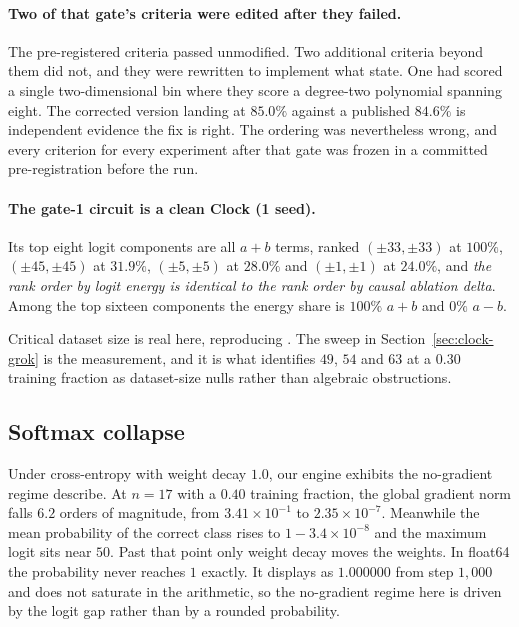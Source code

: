 \paragraph{Two of that gate's criteria were edited after they failed.} The pre-registered
criteria passed unmodified. Two additional criteria beyond them did not, and they were
rewritten to implement what \citet{nanda2023progress} state. One had scored a single
two-dimensional bin where they score a degree-two polynomial spanning eight. The corrected
version landing at $85.0\%$ against a published $84.6\%$ is independent evidence the fix is
right. The ordering was nevertheless wrong, and every criterion for every experiment after
that gate was frozen in a committed pre-registration before the run.

\paragraph{The gate-1 circuit is a clean Clock \textup{(1 seed)}.} Its top eight logit
components are all $a+b$ terms, ranked $(\pm 33, \pm 33)$ at $100\%$, $(\pm 45, \pm 45)$ at
$31.9\%$, $(\pm 5, \pm 5)$ at $28.0\%$ and $(\pm 1, \pm 1)$ at $24.0\%$, and \emph{the rank
order by logit energy is identical to the rank order by causal ablation delta}. Among the top
sixteen components the energy share is $100\%$ $a+b$ and $0\%$ $a-b$.

Critical dataset size is real here, reproducing \citet{power2022grokking}. The sweep in
Section~\ref{sec:clock-grok} is the measurement, and it is what identifies $49$, $54$ and $63$
at a $0.30$ training fraction as dataset-size nulls rather than algebraic obstructions.

\subsection{Softmax collapse}
\label{sec:calib-collapse}

Under cross-entropy with weight decay $1.0$, our engine exhibits the no-gradient regime
\citet{prieto2025grokking} describe. At $n = 17$ with a $0.40$ training fraction, the global
gradient norm falls $6.2$ orders of magnitude, from $3.41 \times 10^{-1}$ to
$2.35 \times 10^{-7}$. Meanwhile the mean probability of the correct class rises to
$1 - 3.4 \times 10^{-8}$ and the maximum logit sits near $50$. Past that point only weight
decay moves the weights. In float64 the probability never reaches $1$ exactly. It displays as
$1.000000$ from step $1{,}000$ and does not saturate in the arithmetic, so the no-gradient
regime here is driven by the logit gap rather than by a rounded probability.


